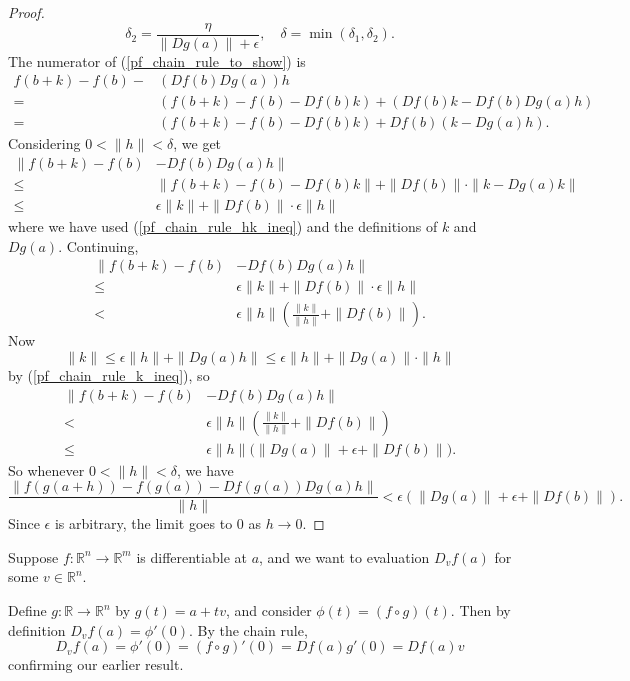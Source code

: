 \documentclass[12pt]{article}
\begin{document}
\begin{proof}
\begin{equation*}
		\delta_2 = \frac{\eta}{\|Dg(a)\|+\epsilon}, \quad \delta=\min(\delta_1,\delta_2).
	\end{equation*}
	The numerator of (\ref{pf_chain_rule_to_show}) is 
	\begin{align*}
		f(b+k)-f(b)-& (Df(b)Dg(a))h \\
		=& (f(b+k)-f(b)-Df(b)k) + (Df(b)k-Df(b)Dg(a)h) \\
		=& (f(b+k)-f(b)-Df(b)k) + Df(b)(k-Dg(a)h).
	\end{align*}
	Considering $0<\|h\|<\delta$, we get 
	\begin{align*}
		\|f(b+k)-f(b)& -Df(b)Dg(a)h\| \\
		\leq& \|f(b+k)-f(b)-Df(b)k\| + \|Df(b)\|\cdot \|k-Dg(a)k\| \\
		\leq& \epsilon\|k\| + \|Df(b)\|\cdot \epsilon\|h\|
	\end{align*}
	where we have used (\ref{pf_chain_rule_hk_ineq}) and the definitions of $k$ and $Dg(a)$. Continuing,
	\begin{align*}
		\|f(b+k)-f(b)& -Df(b)Dg(a)h\| \\
		\leq& \epsilon\|k\| + \|Df(b)\|\cdot \epsilon\|h\| \\
		<& \epsilon\|h\|\left(\frac{\|k\|}{\|h\|}+\|Df(b)\|\right).
	\end{align*}
	Now 
	\begin{equation*}
		\|k\| \leq \epsilon\|h\| + \|Dg(a)h\| \leq \epsilon\|h\|+\|Dg(a)\|\cdot \|h\|
	\end{equation*}
	by (\ref{pf_chain_rule_k_ineq}), so 
	\begin{align*}
		\|f(b+k)-f(b)& -Df(b)Dg(a)h\| \\
		<& \epsilon\|h\|\left(\frac{\|k\|}{\|h\|}+\|Df(b)\|\right) \\
		\leq& \epsilon\|h\|\big( \|Dg(a)\|+\epsilon+\|Df(b)\|\big).
	\end{align*}
	So whenever $0<\|h\|<\delta$, we have 
	\begin{equation*}
		\frac{\|f(g(a+h))-f(g(a))-Df(g(a))Dg(a)h\|}{\|h\|} < \epsilon(\|Dg(a)\| + \epsilon + \|Df(b)\|).
	\end{equation*}
	Since $\epsilon$ is arbitrary, the limit goes to 0 as $h\to 0$.
\end{proof}

\begin{remark}
	Suppose $f:\mathbb{R}^n\to\mathbb{R}^m$ is differentiable at $a$, and we want to evaluation $D_vf(a)$ for some $v\in\mathbb{R}^n$. 

	Define $g:\mathbb{R}\to\mathbb{R}^n$ by $g(t)=a+tv$, and consider $\phi(t)=(f\circ g)(t)$. Then by definition $D_vf(a)=\phi'(0)$. By the chain rule,
	\begin{equation*}
		D_vf(a)=\phi'(0)=(f\circ g)'(0)=Df(a)g'(0)=Df(a)v
	\end{equation*}
	confirming our earlier result.
\end{remark}
\end{document}
